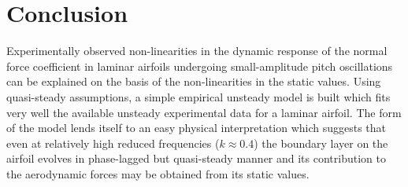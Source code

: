 \section{Conclusion}
Experimentally observed non-linearities in the dynamic response of the normal force coefficient in laminar airfoils undergoing small-amplitude pitch oscillations can be explained on the basis of the non-linearities in the static values. Using quasi-steady assumptions, a simple empirical unsteady model is built which fits very well the available unsteady experimental data for a laminar airfoil. The form of the model lends itself to an easy physical interpretation which suggests that even at relatively high reduced frequencies ($k\approx0.4$) the boundary layer on the airfoil evolves in phase-lagged but quasi-steady manner and its contribution to the aerodynamic forces may be obtained from its static values. 


%
%
%
